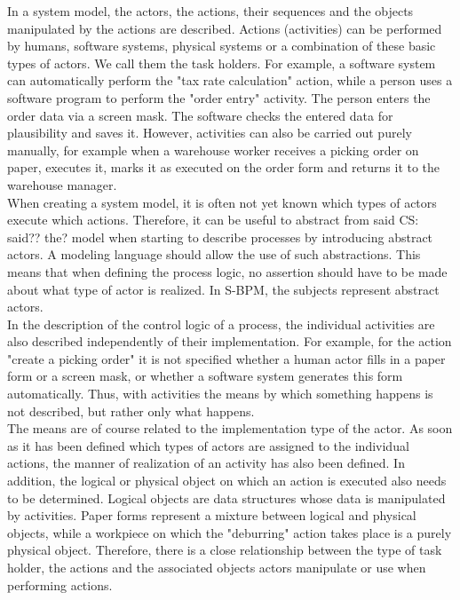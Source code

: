 In a system model, the actors, the actions, their sequences and the objects manipulated by the actions are described. Actions (activities) can be performed by humans, software systems, physical systems or a combination of these basic types of actors. We call them the task holders. For example, a software system can automatically perform the "tax rate calculation" action, while a person uses a software program to perform the "order entry" activity. The person enters the order data via a screen mask. The software checks the entered data for plausibility and saves it. However, activities can also be carried out purely manually, for example when a warehouse worker receives a picking order on paper, executes it, marks it as executed on the order form and returns it to the warehouse manager.\\ 
When creating a system model, it is often not yet known which types of actors execute which actions. Therefore, it can be useful to abstract from said CS: said?? the?  model when starting to describe processes by introducing abstract actors. A modeling language should allow the use of such abstractions. This means that when defining the process logic, no assertion should have to be made about what type of actor is realized. In S-BPM, the subjects represent abstract actors. \\
In the description of the control logic of a process, the individual activities are also described independently of their implementation. For example, for the action "create a picking order" it is not specified whether a human actor fills in a paper form or a screen mask, or whether a software system generates this form automatically. Thus, with activities the means by which something happens is not described, but rather only what happens.\\ 
The means are of course related to the implementation type of the actor. As soon as it has been defined which types of actors are assigned to the individual actions, the manner of realization of an activity has also been defined. In addition, the logical or physical object on which an action is executed also needs to be determined. Logical objects are data structures whose data is manipulated by activities. Paper forms represent a mixture between logical and physical objects, while a workpiece on which the "deburring" action takes place is a purely physical object. Therefore, there is a close relationship between the type of task holder, the actions and the associated objects actors manipulate or use when performing actions.\\
